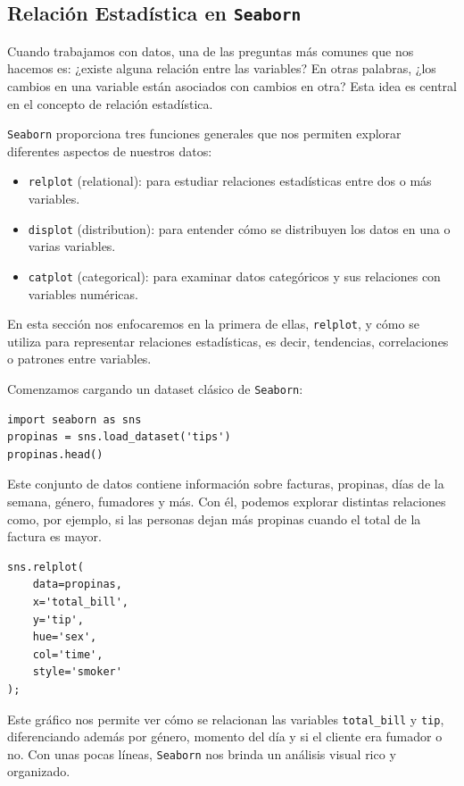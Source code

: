 \documentclass{article}
\theoremstyle{nonumberplain}
\begin{document}
\subsection*{Relación Estadística en \texttt{Seaborn}}

Cuando trabajamos con datos, una de las preguntas más comunes que nos hacemos es: ¿existe alguna relación entre las variables? En otras palabras, ¿los cambios en una variable están asociados con cambios en otra? Esta idea es central en el concepto de relación estadística.

\texttt{Seaborn} proporciona tres funciones generales que nos permiten explorar diferentes aspectos de nuestros datos:

\begin{itemize}
    \item \texttt{relplot} (relational): para estudiar relaciones estadísticas entre dos o más variables.
    \item \texttt{displot} (distribution): para entender cómo se distribuyen los datos en una o varias variables.
    \item \texttt{catplot} (categorical): para examinar datos categóricos y sus relaciones con variables numéricas.
\end{itemize}

En esta sección nos enfocaremos en la primera de ellas, \texttt{relplot}, y cómo se utiliza para representar relaciones estadísticas, es decir, tendencias, correlaciones o patrones entre variables.

Comenzamos cargando un dataset clásico de \texttt{Seaborn}:

\begin{verbatim}
import seaborn as sns
propinas = sns.load_dataset('tips')
propinas.head()
\end{verbatim}

Este conjunto de datos contiene información sobre facturas, propinas, días de la semana, género, fumadores y más. Con él, podemos explorar distintas relaciones como, por ejemplo, si las personas dejan más propinas cuando el total de la factura es mayor.

\begin{verbatim}
sns.relplot(
    data=propinas,
    x='total_bill',
    y='tip',
    hue='sex',
    col='time',
    style='smoker'
);
\end{verbatim}

Este gráfico nos permite ver cómo se relacionan las variables \texttt{total\_bill} y \texttt{tip}, diferenciando además por género, momento del día y si el cliente era fumador o no. Con unas pocas líneas, \texttt{Seaborn} nos brinda un análisis visual rico y organizado.
\end{document}
